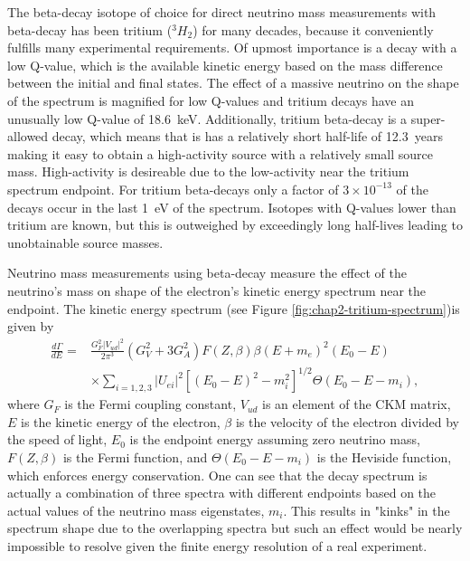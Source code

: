 The beta-decay isotope of choice for direct neutrino mass measurements with beta-decay has been tritium ($^3H_2$) for many decades, because it conveniently fulfills many experimental requirements. Of upmost importance is a decay with a low Q-value, which is the available kinetic energy based on the mass difference between the initial and final states. The effect of a massive neutrino on the shape of the spectrum is magnified for low Q-values and tritium decays have an unusually low Q-value of 18.6~keV. Additionally, tritium beta-decay is a super-allowed decay, which means that is has a relatively short half-life of 12.3~years making it easy to obtain a high-activity source with a relatively small source mass. High-activity is desireable due to the low-activity near the tritium spectrum endpoint. For tritium beta-decays only a factor of $3\times10^{-13}$ of the decays occur in the last 1~eV of the spectrum. Isotopes with Q-values lower than tritium are known, but this is outweighed by exceedingly long half-lives leading to unobtainable source masses.

Neutrino mass measurements using beta-decay measure the effect of the neutrino's mass on shape of the electron's kinetic energy spectrum near the endpoint. The kinetic energy spectrum (see Figure \ref{fig:chap2-tritium-spectrum})is given by 
\begin{equation}
\begin{split}
    \frac{d\Gamma}{dE}=&\frac{G_F^2|V_{ud}|^2}{2\pi^3}(G_V^2+3G_A^2)F(Z,\beta)\beta(E+m_e)^2(E_0-E)\\
    &\times \sum_{i=1,2,3}{|U_{ei}|^2[(E_0-E)^2-m_i^2]^{1/2}\Theta(E_0-E-m_i)},
\end{split}
\end{equation}
where $G_F$ is the Fermi coupling constant, $V_{ud}$ is an element of the CKM matrix, $E$ is the kinetic energy of the electron, $\beta$ is the velocity of the electron divided by the speed of light, $E_0$ is the endpoint energy assuming zero neutrino mass, $F(Z,\beta)$ is the Fermi function, and $\Theta(E_0-E-m_i)$ is the Heviside function, which enforces energy conservation. One can see that the decay spectrum is actually a combination of three spectra with different endpoints based on the actual values of the neutrino mass eigenstates, $m_i$. This results in "kinks" in the spectrum shape due to the overlapping spectra but such an effect would be nearly impossible to resolve given the finite energy resolution of a real experiment. 

